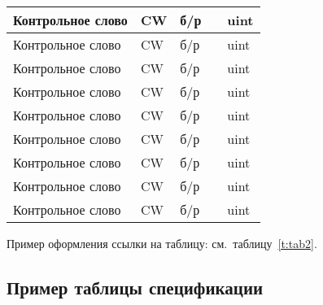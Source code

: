 {\begin{longtable}[c]{| >{\raggedright}m{\wtname} | >{\centering}m{\wtsymbol} | >{\centering}m{\wtunits} | >{\centering}m{\wtbounds} | >{\centering}m{\wtcomment} |}
	Контрольное слово & CW\textunderscore & б/р & \ndash & uint \tabularnewline\hline	
	Контрольное слово & CW\textunderscore & б/р & \ndash & uint \tabularnewline\hline	
	Контрольное слово & CW\textunderscore & б/р & \ndash & uint \tabularnewline\hline	
	Контрольное слово & CW\textunderscore & б/р & \ndash & uint \tabularnewline\hline	
	Контрольное слово & CW\textunderscore & б/р & \ndash & uint \tabularnewline\hline		
	Контрольное слово & CW\textunderscore & б/р & \ndash & uint \tabularnewline\hline		
	Контрольное слово & CW\textunderscore & б/р & \ndash & uint \tabularnewline\hline		
	Контрольное слово & CW\textunderscore & б/р & \ndash & uint \tabularnewline\hline		
	Контрольное слово & CW\textunderscore & б/р & \ndash & uint \tabularnewline\hline	
\end{longtable}
}

Пример оформления ссылки на таблицу: см.~таблицу~\ref{t:tab2}.

\subsection{Пример таблицы спецификации}

